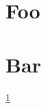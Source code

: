 \documentclass{article}
\begin{document}
    
\section{Foo}
\label{foo}

\section{Bar}
\ref{foo}
\end{document}
